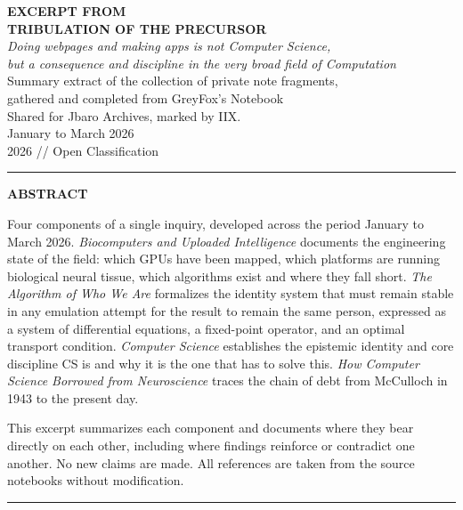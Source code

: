 \documentclass[12pt, a4paper]{article}
\begin{document}
\begin{center}
    {\LARGE\bfseries EXCERPT FROM}\\[0.4em]
    {\LARGE\bfseries TRIBULATION OF THE PRECURSOR}\\[1em]
    {\normalsize\itshape Doing webpages and making apps is not Computer Science,\\
    but a consequence and discipline in the very broad field of Computation}\\[1.5em]
    {\small Summary extract of the collection of private note fragments,\\
    gathered and completed from GreyFox's Notebook}\\[1em]
    {\small Shared for Jbaro Archives, marked by IIX.\\
    January to March 2026\\
    2026 // Open Classification}
\end{center}

\vspace{1.5em}
\hrule
\vspace{1.5em}

\begin{center}
    {\bfseries ABSTRACT}
\end{center}

Four components of a single inquiry, developed across the period January to March 2026.
\textit{Biocomputers and Uploaded Intelligence} documents the engineering state of the field:
which GPUs have been mapped, which platforms are running biological neural tissue, which algorithms
exist and where they fall short. \textit{The Algorithm of Who We Are} formalizes the identity system
that must remain stable in any emulation attempt for the result to remain the same person, expressed
as a system of differential equations, a fixed-point operator, and an optimal transport condition.
\textit{Computer Science} establishes the epistemic identity and core discipline CS is and why it is
the one that has to solve this. \textit{How Computer Science Borrowed from Neuroscience} traces the
chain of debt from McCulloch in 1943 to the present day.

This excerpt summarizes each component and documents where they bear directly on each other,
including where findings reinforce or contradict one another. No new claims are made. All references
are taken from the source notebooks without modification.

\vspace{1.5em}
\hrule
\vspace{1.5em}
\end{document}
